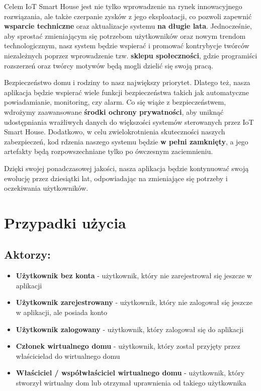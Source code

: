 \documentclass{article}
\begin{document}
	Celem IoT Smart House jest nie tylko wprowadzenie na rynek innowacyjnego rozwiązania,
	ale także czerpanie zysków z jego eksploatacji, co pozwoli zapewnić \textbf{wsparcie
	techniczne} oraz aktualizacje systemu \textbf{na długie lata}. Jednocześnie, aby
	sprostać zmieniającym się potrzebom użytkowników oraz nowym trendom technologicznym,
	nasz system będzie wspierać i promować kontrybycje twórców niezależnych
	poprzez wprowadzenie tzw. \textbf{sklepu społeczności}, gdzie programiści rozszerzeń
	oraz twórcy motywów będą mogli dzielić się swoją pracą.

	Bezpieczeństwo domu i rodziny to nasz największy priorytet. Dlatego też, nasza
	aplikacja będzie wspierać wiele funkcji bezpieczeństwa takich jak automatyczne
	powiadamianie, monitoring, czy alarm. Co się wiąże z bezpieczeństwem, wdrożymy
	zaawansowane \textbf{środki ochrony prywatności}, aby uniknąć udostępniania wrażliwych
	danych do większości systemów sterowanych przez IoT Smart House. Dodatkowo, w celu
	zwielokrotnienia skuteczności naszych zabezpieczeń, kod rdzenia naszego
	systemu będzie \textbf{w pełni zamknięty}, a jego artefakty będą
	rozpowszechniane tylko po ówczesnym zaciemnieniu.

	Dzięki swojej ponadczasowej jakości, nasza aplikacja będzie kontynuować swoją ewolucję
	przez dziesiątki lat, odpowiadając na zmieniające się potrzeby i oczekiwania
	użytkowników.

	\section{Przypadki użycia}
	\subsection{Aktorzy: }
	\begin{itemize}
		\item \textbf{Użytkownik bez konta} - użytkownik, który nie zarejestrował się
			jeszcze w aplikacji

		\item \textbf{Użytkownik zarejestrowany} - użytkownik, który nie zalogował się
			jeszcze w aplikacji, ale posiada konto

		\item \textbf{Użytkownik zalogowany} - użytkownik, który zalogował się do aplikacji

		\item \textbf{Członek wirtualnego domu} - użytkownik, który został przyjęty przez
			właścicielad do wirtualnego domu

		\item \textbf{Właściciel / współwłaściciel wirtualnego domu} - użytkownik, który
			stworzył wirtualny dom lub otrzymał uprawnienia od takiego użytkownika
	\end{itemize}
\end{document}
